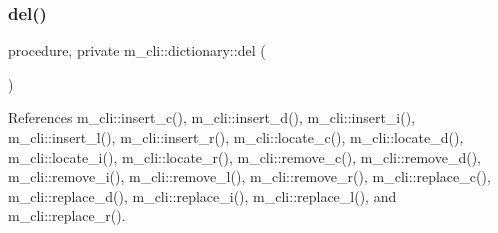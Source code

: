 \subsubsection{\texorpdfstring{del()}{del()}}
{\footnotesize\ttfamily procedure, private m\+\_\+cli\+::dictionary\+::del (\begin{DoxyParamCaption}{ }\end{DoxyParamCaption})\hspace{0.3cm}{\ttfamily [private]}}



References m\+\_\+cli\+::insert\+\_\+c(), m\+\_\+cli\+::insert\+\_\+d(), m\+\_\+cli\+::insert\+\_\+i(), m\+\_\+cli\+::insert\+\_\+l(), m\+\_\+cli\+::insert\+\_\+r(), m\+\_\+cli\+::locate\+\_\+c(), m\+\_\+cli\+::locate\+\_\+d(), m\+\_\+cli\+::locate\+\_\+i(), m\+\_\+cli\+::locate\+\_\+r(), m\+\_\+cli\+::remove\+\_\+c(), m\+\_\+cli\+::remove\+\_\+d(), m\+\_\+cli\+::remove\+\_\+i(), m\+\_\+cli\+::remove\+\_\+l(), m\+\_\+cli\+::remove\+\_\+r(), m\+\_\+cli\+::replace\+\_\+c(), m\+\_\+cli\+::replace\+\_\+d(), m\+\_\+cli\+::replace\+\_\+i(), m\+\_\+cli\+::replace\+\_\+l(), and m\+\_\+cli\+::replace\+\_\+r().

